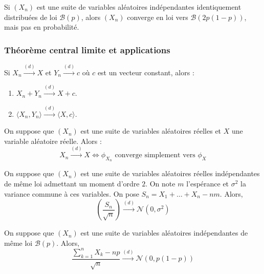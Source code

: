 
	\begin{cexample}
		Si $(X_n)$ est une suite de variables aléatoires indépendantes identiquement distribuées de loi $\mathcal{B}(p)$, alors $(X_n)$ converge en loi vers $\mathcal{B}(2p(1-p))$, mais pas en probabilité.
	\end{cexample}

	\subsubsection{Théorème central limite et applications}


	\begin{theorem}[Slutsky]
		Si $X_n \overset{(d)}{\longrightarrow} X$ et $Y_n \overset{(d)}{\longrightarrow} c$ où $c$ est un vecteur constant, alors :
		\begin{enumerate}[label=(\roman*)]
			\item $X_n + Y_n \overset{(d)}{\longrightarrow} X + c$.
			\item $\langle X_n, Y_n \rangle \overset{(d)}{\longrightarrow} \langle X, c \rangle$.
		\end{enumerate}
	\end{theorem}


	\begin{theorem}[Lévy]
		On suppose que $(X_n)$ est une suite de variables aléatoires réelles et $X$ une variable aléatoire réelle. Alors :
		\[ X_n \overset{(d)}{\longrightarrow} X \iff \phi_{X_n} \text{ converge simplement vers } \phi_X \]
	\end{theorem}


	\begin{theorem}
		On suppose que $(X_n)$ est une suite de variables aléatoires réelles indépendantes de même loi admettant un moment d'ordre $2$. On note $m$ l'espérance et $\sigma^2$ la variance commune à ces variables. On pose $S_n = X_1 + \dots + X_n - nm$. Alors,
		\[ \left ( \frac{S_n}{\sqrt{n}} \right) \overset{(d)}{\longrightarrow} \mathcal{N}(0, \sigma^2) \]
	\end{theorem}

	\begin{application}
		On suppose que $(X_n)$ est une suite de variables aléatoires indépendantes de même loi $\mathcal{B}(p)$. Alors,
		\[ \frac{\sum_{k=1}^{n} X_k - np}{\sqrt{n}} \overset{(d)}{\longrightarrow} \mathcal{N}(0, p(1-p)) \]
	\end{application}

